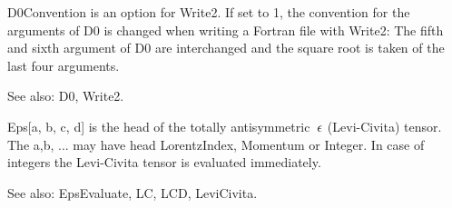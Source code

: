 




D0Convention is an option for Write2. If set to 1, the convention for the arguments of D0 is changed when writing a Fortran file with
  Write2: The fifth and sixth argument of D0 are interchanged and the square root is taken of the last four arguments.

See also: D0, Write2.



Eps[a, b, c, d] is the head of the totally antisymmetric \(\> \epsilon \) (Levi-Civita) tensor. The a,b, ... may have head LorentzIndex, Momentum
or Integer. In case of integers the Levi-Civita tensor is
  evaluated immediately. 



See also:  EpsEvaluate, LC, LCD, LeviCivita.



\dispSFoutmath{
{{\epsilon }^{\mu \nu \rho \sigma }}
}





